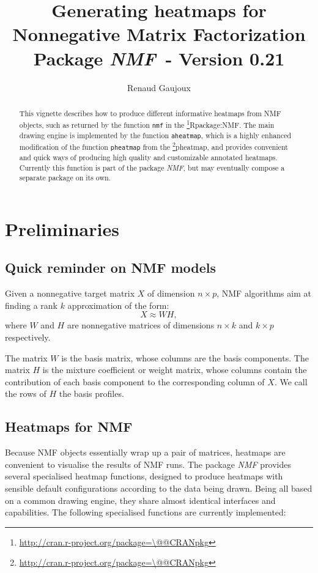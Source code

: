\documentclass[a4paper]{article}\usepackage[]{graphicx}\usepackage[]{color}
\makeatletter
\let\code=\texttt
\newcommand{\pkgname}[1]{\textit{#1}\xspace}
\newcommand{\CRANurl}[1]{\url{http://cran.r-project.org/package=#1}}
\def\CRANpkg{\@ifstar\@CRANpkg\@@CRANpkg}
\def\@CRANpkg#1{\href{http://cran.r-project.org/package=#1}{\pkgname{#1}}\footnote{\CRANurl{#1}}}
\def\@@CRANpkg#1{\href{http://cran.r-project.org/package=#1}{\pkgname{#1}} package\footnote{\CRANurl{#1}}}
\def\citeCRANpkg{\@ifstar\@citeCRANpkg\@@citeCRANpkg}
\def\@citeCRANpkg#1{\CRANpkg{#1}\cite*{Rpackage:#1}}
\def\@@citeCRANpkg#1{\CRANpkg{#1}~\cite{Rpackage:#1}}
\newcommand{\nmfpack}{\pkgname{NMF}}
\renewcommand{\cite}[1]{\parencite{#1}}
\makeatother
\begin{document}
\title{Generating heatmaps for Nonnegative Matrix Factorization\\
\small Package \nmfpack\ - Version 0.21}
\author{Renaud Gaujoux}

\maketitle

\begin{abstract}
This vignette describes how to produce different informative heatmaps from NMF objects, 
such as returned by the function \code{nmf} in the \citeCRANpkg{NMF}.
The main drawing engine is implemented by the function \code{aheatmap}, which is 
a highly enhanced modification of the function \code{pheatmap} from the \CRANpkg{pheatmap},
and provides convenient and quick ways of producing high quality and customizable annotated heatmaps.
Currently this function is part of the package \nmfpack, but may eventually 
compose a separate package on its own.
\end{abstract}

{\small \tableofcontents}

\section{Preliminaries}

\subsection{Quick reminder on NMF models}

Given a nonnegative target matrix $X$ of dimension $n\times p$, NMF algorithms 
aim at finding a rank $k$ approximation of the form:
$$
X \approx W H,
$$
where $W$ and $H$ are nonnegative matrices of dimensions $n\times k$ and $k\times p$ 
respectively.

The matrix $W$ is the basis matrix, whose columns are the basis components.
The matrix $H$ is the mixture coefficient or weight matrix, whose columns contain 
the contribution of each basis component to the corresponding column of $X$.
We call the rows of $H$ the basis profiles.

\subsection{Heatmaps for NMF}

Because NMF objects essentially wrap up a pair of matrices, heatmaps are convenient 
to visualise the results of NMF runs. 
The package \nmfpack provides several specialised heatmap functions, designed to produce 
heatmaps with sensible default configurations according to the data being drawn.
Being all based on a common drawing engine, they share almost identical interfaces 
and capabilities.
The following specialised functions are currently implemented:
\end{document}
